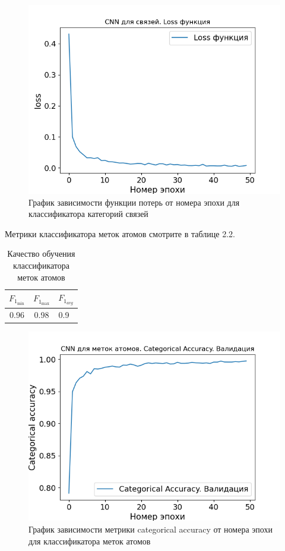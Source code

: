 \begin{figure}[h!] 
	\center
	\includegraphics [scale=0.8] {my_folder/images/bonddir_loss}
	\caption{График зависимости функции потерь от номера эпохи для классификатора категорий связей}
	\label{fig:AP50_bonddir_loss}
\end{figure}

Метрики классификатора меток атомов смотрите в таблице 2.2.

\begin{table}[htbp]%
	\centering
	\label{tab:atomquality}		
	\begin{tabular}{|c|c|c|}
		\hline
		$F_{1_{\min}}$ & $F_{1_{\max}}$ & $F_{1_{avg}}$ \\
		\hline
		0.96 & 0.98 & 0.9\ \\
		\hline
	\end{tabular}
	\caption{Качество обучения классификатора меток атомов}
\end{table}

\begin{figure}[h!] 
	\center
	\includegraphics [scale=0.8] {my_folder/images/atom_accuracy}
	\caption{График зависимости метрики categorical accuracy от номера эпохи для классификатора меток атомов}
	\label{fig:AP50_atom_accuracy}
\end{figure}

